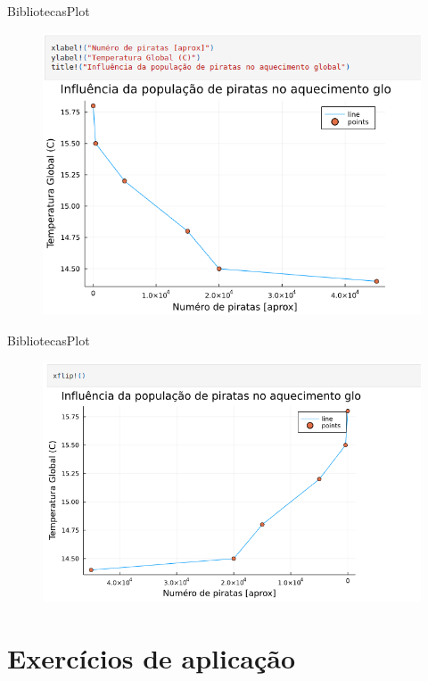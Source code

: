 \documentclass{beamer}
\begin{document}
\begin{frame}{Bibliotecas}{Plot}
    \begin{figure}
        \centering
        \includegraphics[scale=0.4]{imagens/plot05.png}
        \label{fig:my_label}
    \end{figure}
\end{frame}

\begin{frame}{Bibliotecas}{Plot}
    \begin{figure}
        \centering
        \includegraphics[scale=0.4]{imagens/plot06.png}
        \label{fig:my_label}
    \end{figure}
\end{frame}

\section*{Exercícios de aplicação}
\end{document}
